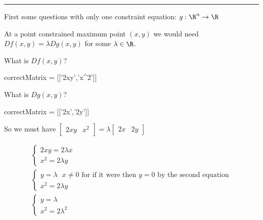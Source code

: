\documentclass{ximera}
\begin{document}
	\hrule

	First some questions with only one constraint equation:  $g:\R^n \to \R$
	
	\begin{question}
		\begin{solution}
		\begin{hint}
			At a point constrained maximum point $(x,y)$ we would need $Df(x,y) = \lambda Dg(x,y)$ for some $\lambda \in \R$.
		\end{hint}
		\begin{hint}
			\begin{question}
			\begin{solution}
				What is $Df(x,y)$?
					\begin{matrix-answer}
						correctMatrix = [['2xy','x^2']]
					\end{matrix-answer}
			\end{solution}
			\begin{solution}
				What is $Dg(x,y)$?
					\begin{matrix-answer}
						correctMatrix = [['2x','2y']]
					\end{matrix-answer}
			\end{solution}
			\end{question}
		\end{hint}
		\begin{hint}
			So we must have \(\begin{bmatrix} 2xy & x^2\end{bmatrix} = \lambda \begin{bmatrix} 2x & 2 y\end{bmatrix}\)
		\end{hint}
		\begin{hint}
			\begin{align*}
				\begin{cases}
				2xy = 2\lambda x\\
				x^2 =  2\lambda y
				\end{cases}\\
				\begin{cases}
				y = \lambda \text{  $x \neq 0$ for if it were then $y=0$ by the second equation}\\
				x^2 =  2\lambda y
				\end{cases}\\
				\begin{cases}
				y = \lambda\\
				x^2 =  2\lambda^2
				\end{cases}
			\end{align*}

\end{hint}
\end{solution}
\end{question}
\end{document}
